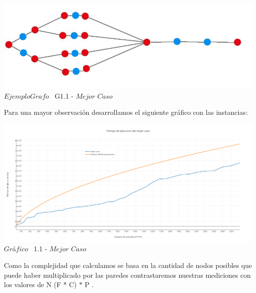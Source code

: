 \vspace*{0.3cm} \vspace*{0.3cm}
  \begin{center}
\includegraphics[scale=0.65]{./EJ1/ej1grafomejorcaso.jpeg}
{$Ejemplo Grafo$ \ G1.1 - $Mejor$ $Caso$}
  \end{center}
  \vspace*{0.3cm}


Para una mayor observaci\'on desarrollamos el siguiente gr\'afico con las instancias:\\

\vspace*{0.3cm} \vspace*{0.3cm}
  \begin{center}
 \includegraphics[scale=0.65]{./EJ1/mejorcaso.png}
 {$Gr$\'a$fico$ \ 1.1 - $Mejor$ $Caso$}
  \end{center}
  \vspace*{0.3cm}

Como la complejidad que calculamos se basa en la cantidad de nodos posibles que puede haber multiplicado por las paredes contrastaremos nuestras mediciones con los valores de N (F * C) $\ast$ P .\\

